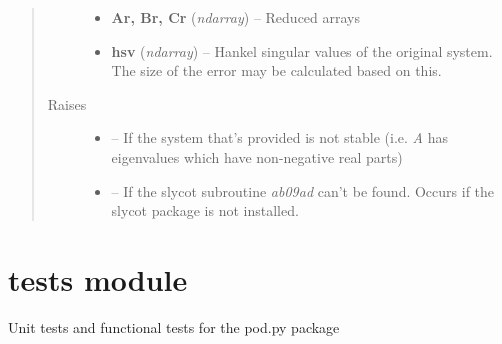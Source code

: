 \documentclass[letterpaper,10pt,english]{sphinxmanual}
\begin{document}
\begin{fulllineitems}
\begin{quote}
\begin{description}
\begin{itemize}
\item {} 
\textbf{Ar, Br, Cr} (\emph{ndarray}) --
Reduced arrays

\item {} 
\textbf{hsv} (\emph{ndarray}) --
Hankel singular values of the original system. The size of the error
may be calculated based on this.

\end{itemize}


\item[{Raises}] \leavevmode\begin{itemize}
\item {} 
 --
If the system that's provided is not stable (i.e. \emph{A} has eigenvalues
which have non-negative real parts)

\item {} 
 --
If the slycot subroutine \emph{ab09ad} can't be found. Occurs if the
slycot package is not installed.

\end{itemize}

\end{description}\end{quote}

\end{fulllineitems}



\chapter{tests module}
\label{tests:module-tests}\label{tests:tests-module}\label{tests::doc}
Unit tests and functional tests for the pod.py package
\end{document}
